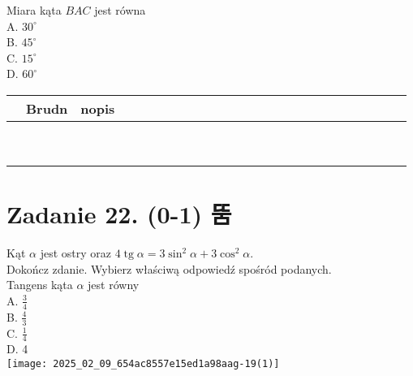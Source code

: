 \documentclass[10pt]{article}
\begin{document}
Miara kąta \(B A C\) jest równa\\
A. \(30^{\circ}\)\\
B. \(45^{\circ}\)\\
C. \(15^{\circ}\)\\
D. \(60^{\circ}\)

\begin{center}
\begin{tabular}{|c|c|c|c|c|c|c|c|c|c|c|c|c|c|c|c|c|c|c|c|c|c|c|c|c|}
\hline
 & Brudn & nopis &  &  &  &  &  &  &  &  &  &  &  &  &  &  &  &  &  &  &  &  &  &  \\
\hline
 &  &  &  &  &  &  &  &  &  &  &  &  &  &  &  &  &  &  &  &  &  &  &  &  \\
\hline
 &  &  &  &  &  &  &  &  &  &  &  &  &  &  &  &  &  &  &  &  &  &  &  &  \\
\hline
 &  &  &  &  &  &  &  &  &  &  &  &  &  &  &  &  &  &  &  &  &  &  &  &  \\
\hline
 &  &  &  &  &  &  &  &  &  &  &  &  &  &  &  &  &  &  &  &  &  &  &  &  \\
\hline
 &  &  &  &  &  &  &  &  &  &  &  &  &  &  &  &  &  &  &  &  &  &  &  &  \\
\hline
 &  &  &  &  &  &  &  &  &  &  &  &  &  &  &  &  &  &  &  &  &  &  &  &  \\
\hline
 &  &  &  &  &  &  &  &  &  &  &  &  &  &  &  &  &  &  &  &  &  &  &  &  \\
\hline
 &  &  &  &  &  &  &  &  &  &  &  &  &  &  &  &  &  &  &  &  &  &  &  &  \\
\hline
 &  &  &  &  &  &  &  &  &  &  &  &  &  &  &  &  &  &  &  &  &  &  &  &  \\
\hline
\end{tabular}
\end{center}

\section*{Zadanie 22. (0-1) 뚬}
Kąt \(\alpha\) jest ostry oraz \(4 \operatorname{tg} \alpha=3 \sin ^{2} \alpha+3 \cos ^{2} \alpha\).\\
Dokończ zdanie. Wybierz właściwą odpowiedź spośród podanych.\\
Tangens kąta \(\alpha\) jest równy\\
A. \(\frac{3}{4}\)\\
B. \(\frac{4}{3}\)\\
C. \(\frac{1}{4}\)\\
D. 4\\
\texttt{[image: 2025\_02\_09\_654ac8557e15ed1a98aag-19(1)]}
\end{document}

